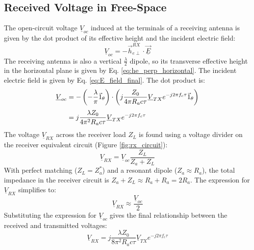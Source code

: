 \subsection{Received Voltage in Free-Space}
The open-circuit voltage $\underline{V}_{oc}$ induced at the terminals of a receiving antenna is given by the dot product of its effective height and the incident electric field:
\begin{equation}
    \underline{V}_{oc} = -\vec{h}_{e\perp}^{RX} \cdot \underline{\vec{E}}
\end{equation}
\vspace{0.5em}
The receiving antenna is also a vertical $\frac{\lambda}{2}$ dipole, so its transverse effective height in the horizontal plane is given by Eq. \ref{eq:he_perp_horizontal}. The incident electric field is given by Eq. \ref{eq:E_field_final}. The dot product is:
\vspace{1em}
\begin{align}
    \underline{V}_{oc} &= -\left(-\frac{\lambda}{\pi} \vec{1}_\theta\right) \cdot \left(j \frac{Z_0}{4\pi R_a c\tau} \underline{V}_{TX} e^{-j2\pi f_c \tau} \vec{1}_\theta\right) \\[\jot]
    &= j \frac{\lambda Z_0}{4\pi^2 R_a c\tau} \underline{V}_{TX} e^{-j2\pi f_c \tau}
\end{align}
\vspace{1em}
The voltage $\underline{V}_{RX}$ across the receiver load $Z_L$ is found using a voltage divider on the receiver equivalent circuit (Figure \ref{fig:rx_circuit}):
\begin{equation}
    \underline{V}_{RX} = \underline{V}_{oc} \frac{Z_L}{Z_a + Z_L}
\end{equation}
\vspace{0.5em}
With perfect matching ($Z_L = Z_a^*$) and a resonant dipole ($Z_a \approx R_a$), the total impedance in the receiver circuit is $Z_a + Z_L \approx R_a + R_a = 2R_a$. The expression for $\underline{V}_{RX}$ simplifies to:
\begin{equation}
    \underline{V}_{RX} \approx \frac{\underline{V}_{oc}}{2}
\end{equation}
\vspace{0.5em}
Substituting the expression for $\underline{V}_{oc}$ gives the final relationship between the received and transmitted voltages:
\begin{equation}
    \underline{V}_{RX} = j \frac{\lambda Z_0}{8\pi^2 R_a c\tau} \underline{V}_{TX} e^{-j2\pi f_c \tau}
    \label{eq:VRX_vs_VTX}
\end{equation}
